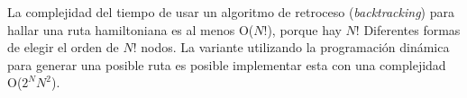  La complejidad del tiempo de usar un algoritmo de retroceso (\emph{backtracking}) para hallar una ruta hamiltoniana es al menos O($N!$), porque hay $N!$ Diferentes formas de elegir el orden de $N!$ nodos. La variante utilizando la programación dinámica para generar una posible ruta es posible implementar esta con una complejidad O($2^N N^2$). 